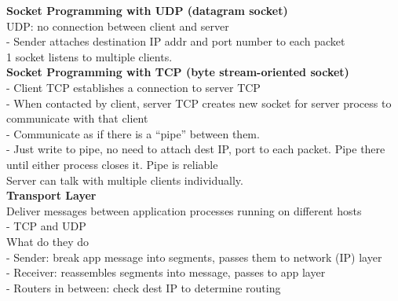 \documentclass[10pt, a4paper]{article}
\newcommand{\blue}[1]{{\color{MidnightBlue}#1}}
\newcommand{\red}[1]{{\color{red}#1}}
\begin{document}
\begin{multicols*}{3}
		\textbf{Socket Programming with \red{UDP} (datagram socket)}\\
		\red{UDP: no connection between client and server}\\
		- Sender attaches destination IP addr and port number to \red{each packet}\\
		\red{1} socket listens to \red{multiple} clients.\\

		\textbf{Socket Programming with \red{TCP} (byte stream-oriented socket)}\\
		- Client TCP establishes a connection to server TCP\\
		- When contacted by client, server TCP \red{creates} new socket for server process to communicate with that client\\
		- Communicate as if there is a ``pipe'' between them.\\
		- Just write to pipe, \blue{no need to attach} dest IP, port to each packet. Pipe there until either process closes it. Pipe is \blue{reliable}\\
		Server can talk with multiple clients individually.\\

		{\normalsize\textbf{Transport Layer}}\\
		Deliver messages between application processes running on different hosts\\
		- \blue{TCP} and \blue{UDP}\\

		What do they do\\
		- Sender: break app message into \blue{segments}, passes them to network (IP) layer\\
		- Receiver: reassembles segments into message, passes to app layer\\
		- Routers in between: check dest IP to determine routing\\


\end{multicols*}
\end{document}
